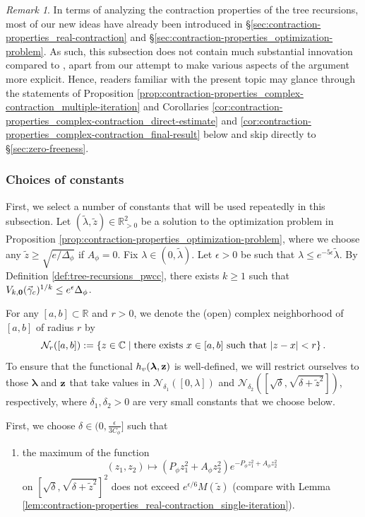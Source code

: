 \documentclass[11pt]{article}
\newcommand{\R}{\mathbb R}
\newcommand{\C}{\mathbb C}
\newcommand{\bl}{\bm{\lambda}}
\newcommand{\pwcc}{\Delta_{\phi}}
\newcommand{\bz}{\vb{z}}
\newcommand{\tl}{\tilde{\lambda}}
\newcommand{\tz}{\tilde{z}}
\newcommand{\aconst}{A_{\phi}}
\newcommand{\pconst}{P_{\phi}}
\newcommand{\set}[1]{\left\{#1\right\}}
\numberwithin{equation}{section}
\theoremstyle{plain}
\theoremstyle{definition}
\theoremstyle{remark}
\newtheorem{remark}[theorem]{Remark}
\begin{document}
\begin{remark}
In terms of analyzing the contraction properties of the tree recursions, most of our new ideas have already been introduced in \S\ref{sec:contraction-properties_real-contraction} and \S\ref{sec:contraction-properties_optimization-problem}.
As such, this subsection does not contain much substantial innovation compared to \cite[\S A.2]{michelen2023analyticity}, apart from our attempt to make various aspects of the argument more explicit.
Hence, readers familiar with the present topic may glance through the statements of Proposition \ref{prop:contraction-properties_complex-contraction_multiple-iteration} and Corollaries \ref{cor:contraction-properties_complex-contraction_direct-estimate} and \ref{cor:contraction-properties_complex-contraction_final-result} below and skip directly to \S\ref{sec:zero-freeness}.
\end{remark}



\subsubsection{Choices of constants}
\label{sec:contraction-properties_complex-contraction_choices-of-constants}

First, we select a number of constants that will be used repeatedly in this subsection.
Let $(\tl,\tz)\in\R_{>0}^{2}$ be a solution to the optimization problem in Proposition \ref{prop:contraction-properties_optimization-problem}, where we choose any $\tz\ge\sqrt{e/\pwcc}$ if $\aconst=0$.
Fix $\lambda\in(0,\tl)$.
Let $\epsilon>0$ be such that $\lambda\le e^{-5\epsilon}\tl$.
By Definition \ref{def:tree-recursions_pwcc}, there exists $k\ge 1$ such that $V_{k,\vb{0}}(\vec{\gamma}_{c})^{1/k}\le e^{\epsilon}\pwcc$.

For any $[a,b]\subset\R$ and $r>0$, we denote the (open) complex neighborhood of $[a,b]$ of radius $r$ by
\begin{equation}
\mathcal{N}_{r}([a,b]):=\set{z\in\C\mid\text{there exists }x\in[a,b]\text{ such that }\abs{z-x}<r}.
\end{equation}
To ensure that the functional $h_{v}(\bl,\bz)$ is well-defined, we will restrict ourselves to those $\bl$ and $\bz$ that take values in $\mathcal{N}_{\delta_{1}}([0,\lambda])$ and $\mathcal{N}_{\delta_{2}}([\sqrt{\delta},\sqrt{\delta+\tz^{2}}])$, respectively, where $\delta_{1},\delta_{2}>0$ are very small constants that we choose below.

First, we choose $\delta\in(0,\frac{\epsilon}{3C_{\phi}}]$ such that
\begin{enumerate}[label=(\roman*)]
\item the maximum of the function 
\begin{equation}
(z_{1},z_{2})\mapsto(\pconst z_{1}^{2}+\aconst z_{2}^{2})e^{-\pconst z_{1}^{2}+\aconst z_{2}^{2}}
\end{equation}
on $[\sqrt{\delta},\sqrt{\delta+\tz^{2}}]^{2}$ does not exceed $e^{\epsilon/6}M(\tz)$ (compare with Lemma \ref{lem:contraction-properties_real-contraction_single-iteration}).
\label{itm:contraction-properties_complex-contraction_choices-of-constants_shifted-real-maximum}
\end{enumerate}
\end{document}
